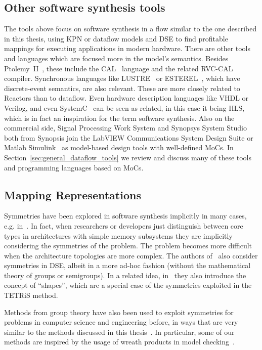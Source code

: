 \subsection{Other software synthesis tools}
The tools above focus on software synthesis in a flow similar to the one described in this thesis, using \ac{KPN} or dataflow models and \ac{DSE} to find profitable mappings for executing applications in modern hardware.
There are other tools and languages which are focused more in the model's semantics. Besides Ptolemy~II~\cite{Ptolemaeus:14:SystemDesign}, these include the CAL~\cite{eker2003cal} language and the related \ac{RVC}-CAL compiler.
Synchronous languages like LUSTRE~\cite{lustre} or ESTEREL~\cite{esterel}, which have discrete-event semantics, are also relevant. These are more closely related to Reactors than to dataflow.
Even hardware description languages like VHDL or Verilog, and even SystemC~\cite{semantics_systemc} can be seen as related, in this case it being \ac{HLS}, which is in fact an inspiration for the term software synthesis.
Also on the commercial side, Signal Processing Work System and Synopsys System Studio both from Synopsis join the LabVIEW Communications System Design Suite or Matlab Simulink~\cite{klikpo2016modeling} as model-based design tools with well-defined \acp{MoC}.
In Section~\ref{sec:general_dataflow_tools} we review and discuss many of these tools and programming languages based on \acp{MoC}.

\subsection{Mapping Representations}
Symmetries have been explored in software synthesis implicitly in many cases, e.g. in~\cite{singh2010communication,thompson2013exploiting}. 
In fact, when researchers or developers just distinguish between core types in architectures with simple memory subsystems they are implicitly considering the symmetries of the problem.
The problem becomes more difficult when the architecture topologies are more complex.
The authors of~\cite{schwarzer2017symmetry} also consider symmetries in \ac{DSE}, albeit in a more ad-hoc fashion (without the mathematical theory of groups or semigroups).
In a related idea, in~\cite{shapes} they also introduce the concept of ``shapes'', which are a special case of the symmetries exploited in the \ac{TETRiS} method.

Methods from group theory have also been used to exploit symmetries for problems in computer science and engineering before, in ways that are very similar to the methods discussed in this thesis~\cite{crawford1996symmetry,clarke1998symmetry}.
In particular, some of our methods are inspired by the usage of wreath products in model checking~\cite{donaldson2009constructive}.

